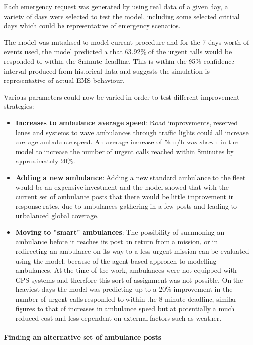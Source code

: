 \documentclass[11pt]{article} %
\begin{document}
Each emergency request was generated by using real data of a given day, a variety of days were selected to test the model, including some selected critical days which could be representative of emergency scenarios. 

The model was initialised to model current procedure and for the 7 days worth of events used, the model predicted a that 63.92\% of the urgent calls would be responded to within the 8minute deadline. This is within the 95\% confidence interval produced from historical data and suggests the simulation is representative of actual EMS behaviour. 

Various parameters could now be varied in order to test different improvement strategies:
\begin{itemize}
	\item \textbf{Increases to  ambulance average speed}: Road improvements, reserved lanes and systems to wave ambulances through traffic lights could all increase average ambulance speed. An average increase of 5km/h was shown in the model to increase the number of urgent calls reached within 8minutes by approximately 20\%.
	\item \textbf{Adding a new ambulance}:  Adding a new standard ambulance to the fleet would be an expensive investment and the model showed that with the current set of ambulance posts that there would be little improvement in response rates, due to ambulances gathering in a few posts and leading to unbalanced global coverage. 
	\item \textbf{Moving to "smart" ambulances}: The possibility of summoning an ambulance before it reaches its post on return from a mission, or in redirecting an ambulance on its way to a less urgent mission can be evaluated using the model, because of the agent based approach to modelling ambulances. At the time of the work, ambulances were not equipped with GPS systems and therefore this sort of assignment was not possible. On the heaviest days the model was predicting up to a 20\% improvement in the number of urgent calls responded to within the 8 minute deadline, similar figures to that of increases in ambulance speed but at potentially a much reduced cost and less dependent on external factors such as weather. 
\end{itemize}

\paragraph{Finding an alternative set of ambulance posts}
\end{document}
